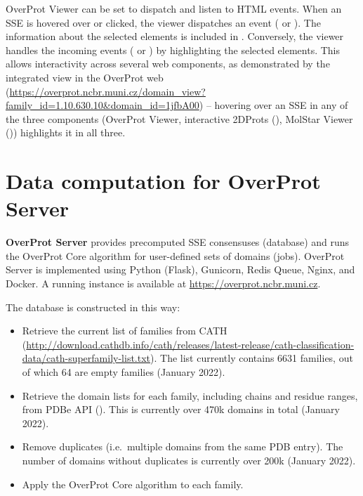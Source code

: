 \documentclass{article}
\begin{document}
OverProt Viewer can be set to dispatch and listen to HTML events. 
When an SSE is hovered over or clicked, the viewer dispatches an event 
( or ). 
The information about the selected elements is included in .
Conversely, the viewer handles the incoming events ( 
or ) by highlighting the selected elements. 
This allows interactivity across several web components, as demonstrated by 
the integrated view in the OverProt web 
(\url{https://overprot.ncbr.muni.cz/domain_view?family_id=1.10.630.10&domain_id=1jfbA00})
-- hovering over an SSE in any of the three components (OverProt Viewer, 
interactive 2DProts (), 
MolStar Viewer ()) highlights it in all three.





\section{Data computation for OverProt Server}

\textbf{OverProt Server} provides precomputed SSE consensuses (database)
and runs the OverProt Core algorithm for user-defined sets of domains (jobs). 
OverProt Server is implemented using Python (Flask), Gunicorn, Redis Queue, Nginx, and Docker.
A running instance is available at \url{https://overprot.ncbr.muni.cz}.


The database is constructed in this way:

\begin{itemize}
\item
  Retrieve the current list of families from CATH
  (\url{http://download.cathdb.info/cath/releases/latest-release/cath-classification-data/cath-superfamily-list.txt}).
  The list currently contains 6631 families, out of which 64 are empty
  families (January 2022).
\item
  Retrieve the domain lists for each family, including chains and
  residue ranges, from PDBe API
  (). This is
  currently over 470k domains in total (January 2022).
\item
  Remove duplicates (i.e.~multiple domains from the same PDB entry).
  The number of domains without duplicates is currently over 200k (January 2022).
\item
  Apply the OverProt Core algorithm to each family.
\end{itemize}
\end{document}
